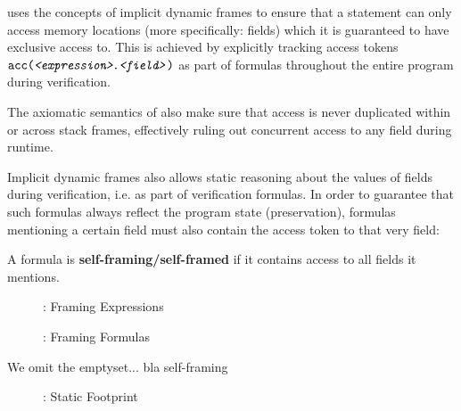 

\svl uses the concepts of implicit dynamic frames to ensure that a statement can only access memory locations (more specifically: fields) which it is guaranteed to have exclusive access to.
This is achieved by explicitly tracking access tokens $\texttt{acc(\textit{<expression>}.\textit{<field>})}$ as part of formulas throughout the entire program during verification.
    
The axiomatic semantics of \svl also make sure that access is never duplicated within or across stack frames, effectively ruling out concurrent access to any field during runtime.

Implicit dynamic frames also allows static reasoning about the values of fields during verification, i.e. as part of verification formulas.
In order to guarantee that such formulas always reflect the program state (preservation), formulas mentioning a certain field must also contain the access token to that very field:
\begin{definition}
    A formula is \textbf{self-framing/self-framed} if it contains access to all fields it mentions.
\end{definition}




\begin{figure}
    
    \caption{\svl: Framing Expressions}
\end{figure}

\begin{figure}
    
    \caption{\svl: Framing Formulas}
\end{figure}

We omit the emptyset... bla self-framing

\begin{figure}
    
    \caption{\svl: Static Footprint}
\end{figure}


